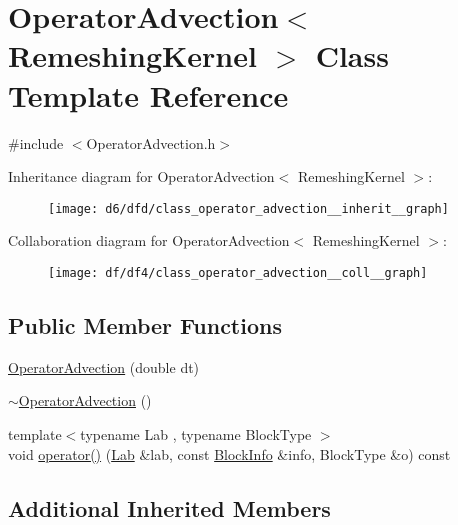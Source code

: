 \hypertarget{class_operator_advection}{}\section{Operator\+Advection$<$ Remeshing\+Kernel $>$ Class Template Reference}
\label{class_operator_advection}


{\ttfamily \#include $<$Operator\+Advection.\+h$>$}



Inheritance diagram for Operator\+Advection$<$ Remeshing\+Kernel $>$\+:\nopagebreak
\begin{figure}[H]
\begin{center}
\leavevmode
\texttt{[image: d6/dfd/class\_operator\_advection\_\_inherit\_\_graph]}
\end{center}
\end{figure}


Collaboration diagram for Operator\+Advection$<$ Remeshing\+Kernel $>$\+:\nopagebreak
\begin{figure}[H]
\begin{center}
\leavevmode
\texttt{[image: df/df4/class\_operator\_advection\_\_coll\_\_graph]}
\end{center}
\end{figure}
\subsection*{Public Member Functions}
\begin{DoxyCompactItemize}
\item 
\hyperlink{class_operator_advection_a174044f2ff03c8d58e44b9d89dfaa4f8}{Operator\+Advection} (double dt)
\item 
\hyperlink{class_operator_advection_a29553dba616cbabc01b4a6f29469c08c}{$\sim$\+Operator\+Advection} ()
\item 
{\footnotesize template$<$typename Lab , typename Block\+Type $>$ }\\void \hyperlink{class_operator_advection_a15dcc82744e11ed8f0a741e0143dbeac}{operator()} (\hyperlink{_definitions_8h_ae720d9054713370bbf4c86860e4dde70}{Lab} \&lab, const \hyperlink{struct_block_info}{Block\+Info} \&info, Block\+Type \&o) const 
\end{DoxyCompactItemize}
\subsection*{Additional Inherited Members}


